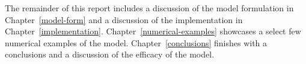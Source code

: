 The remainder of this report includes a discussion of the model
formulation in Chapter~\ref{model-form} and a discussion of the
implementation in
Chapter~\ref{implementation}. Chapter~\ref{numerical-examples}
showcases a select few numerical examples of the
model. Chapter~\ref{conclusions} finishes with a conclusions and a
discussion of the efficacy of the model.
